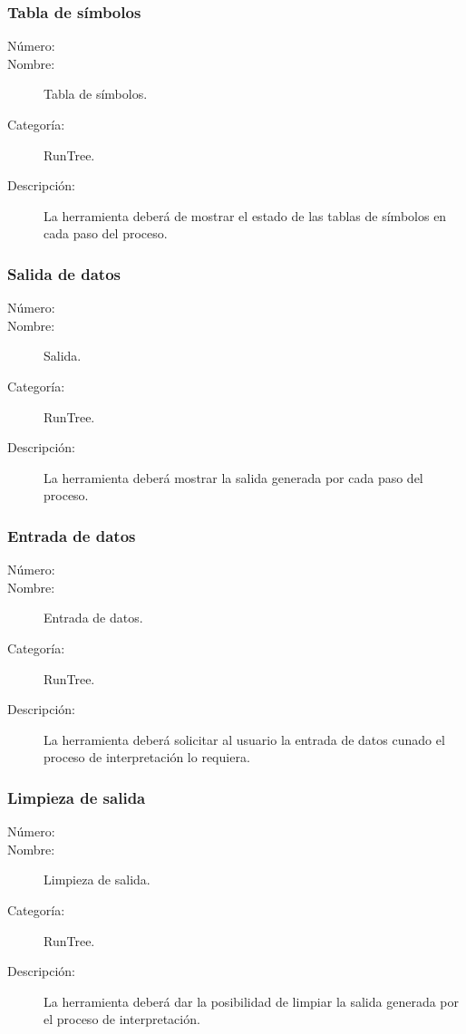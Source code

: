 \subsubsection{Tabla de símbolos}
	\begin{description}
		\item [Número:] \cn
		\item [Nombre:] Tabla de símbolos.
		\item [Categoría:] RunTree.
		\item [Descripción:] La herramienta deberá de mostrar el estado de las tablas de símbolos en cada paso del proceso.
	\end {description}

\subsubsection{Salida de datos}
	\begin{description}
		\item [Número:] \cn
		\item [Nombre:] Salida.
		\item [Categoría:] RunTree.
		\item [Descripción:] La herramienta deberá mostrar la salida generada por cada paso del proceso.
	\end {description}

\subsubsection{Entrada de datos}
	\begin{description}
		\item [Número:] \cn
		\item [Nombre:] Entrada de datos.
		\item [Categoría:] RunTree.
		\item [Descripción:] La herramienta deberá solicitar al usuario la entrada de datos cunado el proceso de interpretación lo requiera.
	\end {description}

\subsubsection{Limpieza de salida}
	\begin{description}
		\item [Número:] \cn
		\item [Nombre:] Limpieza de salida.
		\item [Categoría:] RunTree.
		\item [Descripción:] La herramienta deberá dar la posibilidad de limpiar la salida generada por el proceso de interpretación.
	\end {description}

